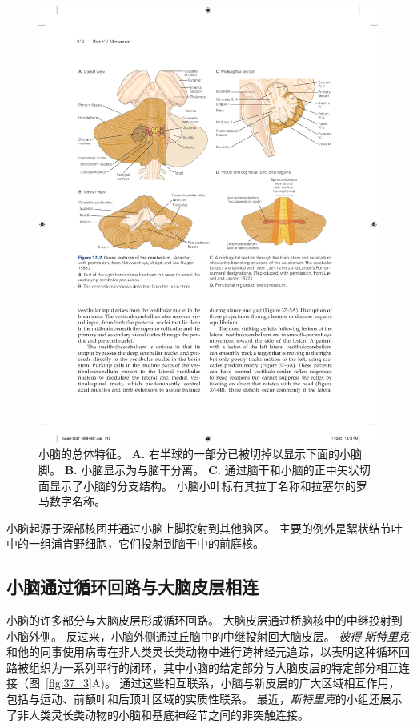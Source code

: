 \begin{figure}[htbp]
	\centering
	\includegraphics[width=1.0\linewidth]{chap37/fig_37_2}
	\caption{小脑的总体特征\cite{nieuwenhuys2007human}。
		\textbf{A.} 右半球的一部分已被切掉以显示下面的小脑脚。
		\textbf{B.} 小脑显示为与脑干分离。
		\textbf{C.} 通过脑干和小脑的正中矢状切面显示了小脑的分支结构。 
		小脑小叶标有其拉丁名称和拉塞尔的罗马数字名称\cite{larsell1972comparative}。}
	\label{fig:37_2}
\end{figure}



小脑起源于深部核团并通过小脑上脚投射到其他脑区。
主要的例外是絮状结节叶中的一组浦肯野细胞，它们投射到脑干中的前庭核。



\subsection{小脑通过循环回路与大脑皮层相连}

小脑的许多部分与大脑皮层形成循环回路。
大脑皮层通过桥脑核中的中继投射到小脑外侧。
反过来，小脑外侧通过丘脑中的中继投射回大脑皮层。
\textit{彼得$\cdot$斯特里克}和他的同事使用病毒在非人类灵长类动物中进行跨神经元追踪，以表明这种循环回路被组织为一系列平行的闭环，其中小脑的给定部分与大脑皮层的特定部分相互连接（图~\ref{fig:37_3}A)。
通过这些相互联系，小脑与新皮层的广大区域相互作用，包括与运动、前额叶和后顶叶区域的实质性联系。
最近，\textit{斯特里克}的小组还展示了非人类灵长类动物的小脑和基底神经节之间的非突触连接。


